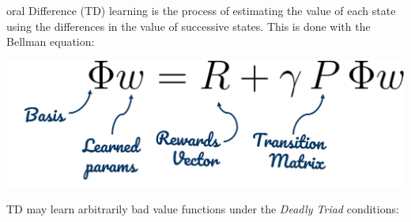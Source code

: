 oral Difference (TD) learning is the process of estimating the value of each state using the differences in the value of successive states. This is done with the Bellman equation:
\begin{center}
    \includegraphics[scale=0.4]{parts/intro/bellman}
\end{center}
TD may learn arbitrarily bad value functions under the \emph{Deadly Triad} conditions:
